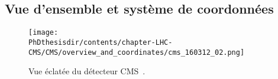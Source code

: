 \subsection{Vue d'ensemble et système de coordonnées}\label{chapter-LHC-section-CMS-subsec-overview_and_coordinates}

\begin{figure}[h]
\centering
\texttt{[image: \\PhDthesisdir/contents/chapter-LHC-CMS/CMS/overview\_and\_coordinates/cms\_160312\_02.png]}
\caption[Vue éclatée du détecteur CMS.]{Vue éclatée du détecteur CMS~\cite{Lapka:2712624}.}
\label{fig-chapter-LHC-section-CMS-subsec-overview_and_coordinates-vue_eclatee_CMS}
\end{figure}
